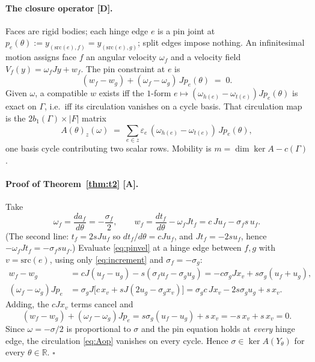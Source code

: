 \documentclass[11pt,a4paper]{article}
\theoremstyle{definition}
\begin{document}
\paragraph{The closure operator [D].} Faces are rigid bodies; each hinge edge $e$ is a pin
joint at $p_e(\theta):=y_{(\mathrm{src}(e),f)}=y_{(\mathrm{src}(e),g)}$; split edges impose
nothing. An infinitesimal motion assigns face $f$ an angular velocity $\omega_f$ and a
velocity field $V_f(y)=\omega_f Jy + w_f$. The pin constraint at $e$ is
\begin{equation}
(w_f-w_g) + (\omega_f-\omega_g)\,J p_e(\theta) \;=\; 0 .
\label{eq:pinvel}
\end{equation}
Given $\omega$, a compatible $w$ exists iff the $1$-form
$e\mapsto(\omega_{h(e)}-\omega_{t(e)})Jp_e(\theta)$ is exact on $\Gamma$, i.e.\ iff its
circulation vanishes on a cycle basis. That circulation map is the
$2b_1(\Gamma)\times|F|$ matrix
\begin{equation}
A(\theta)_z(\omega) \;=\; \sum_{e\in z}\varepsilon_e\,(\omega_{h(e)}-\omega_{t(e)})\,Jp_e(\theta),
\label{eq:Aop}
\end{equation}
one basis cycle contributing two scalar rows. Mobility is
$m=\dim\ker A - c(\Gamma)$.

\paragraph{Proof of Theorem~\ref{thm:t2} [A].} Take
\begin{equation}
\omega_f = \frac{da_f}{d\theta} = -\frac{\sigma_f}{2},
\qquad
w_f = \frac{dt_f}{d\theta} - \omega_f J t_f = c\,Ju_f - \sigma_f s\, u_f .
\label{eq:t23}
\end{equation}
(The second line: $t_f=2sJu_f$ so $dt_f/d\theta=cJu_f$, and $Jt_f=-2su_f$, hence
$-\omega_fJt_f=-\sigma_f s u_f$.) Evaluate \eqref{eq:pinvel} at a hinge edge between $f,g$
with $v=\mathrm{src}(e)$, using only \eqref{eq:increment} and $\sigma_f=-\sigma_g$:
\begin{align*}
w_f-w_g &= cJ(u_f-u_g) - s(\sigma_fu_f-\sigma_gu_g) = -c\sigma_gJx_v + s\sigma_g(u_f+u_g),\\
(\omega_f-\omega_g)Jp_e &= \sigma_g J\bigl[c\,x_v + sJ(2u_g-\sigma_gx_v)\bigr]
 = \sigma_g c\,Jx_v - 2s\sigma_g u_g + s\,x_v .
\end{align*}
Adding, the $cJx_v$ terms cancel and
\[
(w_f-w_g)+(\omega_f-\omega_g)Jp_e = s\sigma_g(u_f-u_g)+s\,x_v = -s\,x_v+s\,x_v = 0 .
\]
Since $\omega=-\sigma/2$ is proportional to $\sigma$ and the pin equation holds at
\emph{every} hinge edge, the circulation \eqref{eq:Aop} vanishes on every cycle. Hence
$\sigma\in\ker A(Y_\theta)$ for every $\theta\in\mathbb{R}$. \hfill$\square$
\end{document}
